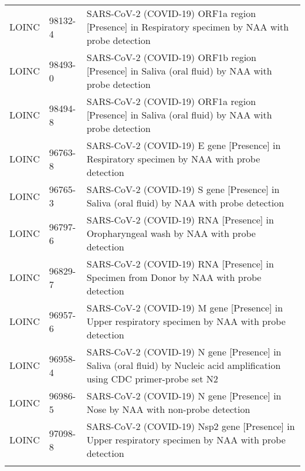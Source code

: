 \begin{longtable}{p{}p{}p{}}
  LOINC & 98132-4 & SARS-CoV-2 (COVID-19) ORF1a region [Presence] in Respiratory specimen by NAA with probe detection \\ 
  LOINC & 98493-0 & SARS-CoV-2 (COVID-19) ORF1b region [Presence] in Saliva (oral fluid) by NAA with probe detection \\ 
  LOINC & 98494-8 & SARS-CoV-2 (COVID-19) ORF1a region [Presence] in Saliva (oral fluid) by NAA with probe detection \\ 
  LOINC & 96763-8 & SARS-CoV-2 (COVID-19) E gene [Presence] in Respiratory specimen by NAA with probe detection \\ 
  LOINC & 96765-3 & SARS-CoV-2 (COVID-19) S gene [Presence] in Saliva (oral fluid) by NAA with probe detection \\ 
  LOINC & 96797-6 & SARS-CoV-2 (COVID-19) RNA [Presence] in Oropharyngeal wash by NAA with probe detection \\ 
  LOINC & 96829-7 & SARS-CoV-2 (COVID-19) RNA [Presence] in Specimen from Donor by NAA with probe detection \\ 
  LOINC & 96957-6 & SARS-CoV-2 (COVID-19) M gene [Presence] in Upper respiratory specimen by NAA with probe detection \\ 
  LOINC & 96958-4 & SARS-CoV-2 (COVID-19) N gene [Presence] in Saliva (oral fluid) by Nucleic acid amplification using CDC primer-probe set N2 \\ 
  LOINC & 96986-5 & SARS-CoV-2 (COVID-19) N gene [Presence] in Nose by NAA with non-probe detection \\ 
  LOINC & 97098-8 & SARS-CoV-2 (COVID-19) Nsp2 gene [Presence] in Upper respiratory specimen by NAA with probe detection \\ 
  \hline
\label{tab:codes_covid_labs}
\end{longtable}
